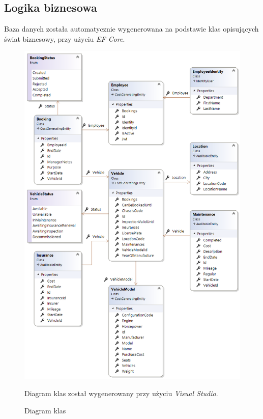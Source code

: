 \documentclass[eng,printmode,openany]{mgr}
\begin{document}
\subsection{Logika biznesowa}
Baza danych została automatycznie wygenerowana na podstawie klas opisujących świat biznesowy, przy użyciu \textit{EF Core}. 
\begin{figure}[H]
	\centering
	\includegraphics[scale=0.64]{images/vs_class_diagram.png}
	\caption{Diagram klas}
	\small 
	Diagram klas został wygenerowany przy użyciu \textit{Visual Studio}.
\end{figure}


\end{document}
